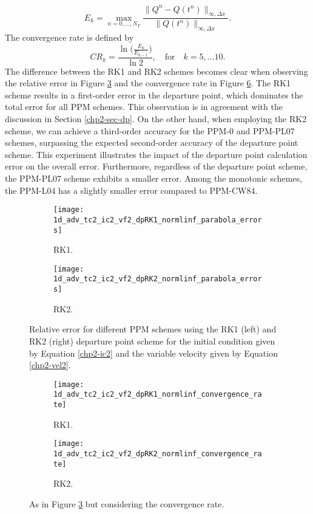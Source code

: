 \begin{equation*}
	E_k = \max_{n=0,\ldots, N_T}
	\frac{\| Q^n - Q(t^n) \|_{\infty, \Delta x}}{\|Q(t^n)\|_{\infty, \Delta x}}.
\end{equation*}
The convergence rate is defined by
\begin{equation*}
	CR_k = \frac{\ln{\bigg(\frac{E_{k}}{E_{k-1}}}\bigg)}{\ln 2}, \quad \text{for} \quad k = 5, \ldots 10.
\end{equation*}
The difference between the RK1 and RK2 schemes becomes clear when observing the relative error in Figure \ref{chp2-sec-exp-adv2-2} and the convergence rate in Figure
\ref{chp2-sec-exp-adv2-3}.
The RK1 scheme results in a first-order error in the departure point, which dominates the total error for all PPM schemes.
This observation is in agreement with the discussion in Section \ref{chp2-sec-dp}.
On the other hand, when employing the RK2 scheme, we can achieve a third-order accuracy for the PPM-0 and PPM-PL07 schemes,
surpassing the expected second-order accuracy of the departure point scheme.
This experiment illustrates the impact of the departure point calculation error on the
overall error.
Furthermore, regardless of the departure point scheme, the PPM-PL07 scheme exhibits a smaller error.
Among the monotonic schemes, the PPM-L04 has a slightly smaller error compared to PPM-CW84.
\begin{figure}[!htb]
	\centering
	\begin{subfigure}{0.45\textwidth}
		\centering
		\texttt{[image: 1d\_adv\_tc2\_ic2\_vf2\_dpRK1\_normlinf\_parabola\_errors]}
		\caption{RK1.\label{chp2-sec-exp-adv2-error-rk1}}
	\end{subfigure}
	\begin{subfigure}{0.45\textwidth}
		\centering
		\texttt{[image: 1d\_adv\_tc2\_ic2\_vf2\_dpRK2\_normlinf\_parabola\_errors]}
		\caption{RK2.\label{chp2-sec-exp-adv2-rk3}}
	\end{subfigure}
	\caption{Relative error for different PPM schemes using the RK1 (left) and RK2 (right)
		departure point scheme for the initial condition given by Equation
		\eqref{chp2-ic2} and the variable 
		velocity given by Equation \eqref{chp2-vel2}.\label{chp2-sec-exp-adv2-2}}
\end{figure}

\begin{figure}[!htb]
	\centering
	\begin{subfigure}{0.45\textwidth}
		\centering
		\texttt{[image: 1d\_adv\_tc2\_ic2\_vf2\_dpRK1\_normlinf\_convergence\_rate]}
		\caption{RK1.\label{chp2-sec-exp-adv2-cr-rk1}}
	\end{subfigure}
	\begin{subfigure}{0.45\textwidth}
		\centering
		\texttt{[image: 1d\_adv\_tc2\_ic2\_vf2\_dpRK2\_normlinf\_convergence\_rate]}
		\caption{RK2.\label{chp2-sec-exp-adv2-cf-rk2}}
	\end{subfigure}
	\caption{As in Figure \ref{chp2-sec-exp-adv2-2} but considering the convergence rate. \label{chp2-sec-exp-adv2-3}}
\end{figure}

